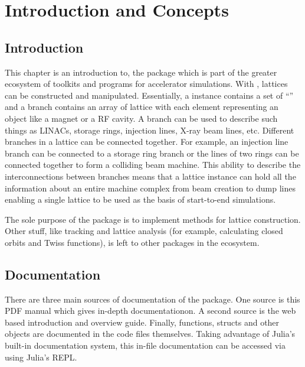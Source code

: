 \chapter{Introduction and Concepts}

\section{Introduction}

This chapter is an introduction to, the \accellat package which is part of the
greater \bmadjl ecosystem of toolkits and programs for accelerator simulations. With \accellat,
lattices can be constructed and manipulated. Essentially, a  instance contains
a set of ``'' and a branch contains 
an array of lattice  with each element representing an object like a magnet
or a RF cavity. A branch can be used to describe such
things as LINACs, storage rings, injection lines, X-ray beam lines, etc. Different branches in a
lattice can be connected together. For example, an injection line branch can be connected to a storage
ring branch or the lines of two rings can be connected together to form a colliding beam machine. 
This ability to describe the interconnections between branches means that 
a lattice instance can hold all the information about an entire machine complex from beam creation
to dump lines enabling a single lattice to be used as the basis of start-to-end simulations.

The sole purpose of the \accellat package is to implement methods for lattice construction.
Other stuff, like tracking and lattice analysis (for example, calculating
closed orbits and Twiss functions), is left to other packages in the \bmadjl ecosystem.

\section{Documentation}

There are three main sources of documentation of the \accellat package. 
One source is this PDF manual which gives in-depth documentationon. 
A second source is the web based introduction and overview guide.
Finally, functions, structs and other objects are documented in the code files themselves. 
Taking advantage of Julia's built-in documentation system, this in-file documentation can be accessed
via using Julia's REPL.

